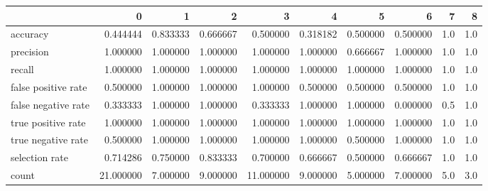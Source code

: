 \begin{tabular}{lrrrrrrrrr}
\toprule
{} &          0 &         1 &         2 &          3 &         4 &         5 &         6 &    7 &    8 \\
\midrule
accuracy            &   0.444444 &  0.833333 &  0.666667 &   0.500000 &  0.318182 &  0.500000 &  0.500000 &  1.0 &  1.0 \\
precision           &   1.000000 &  1.000000 &  1.000000 &   1.000000 &  1.000000 &  0.666667 &  1.000000 &  1.0 &  1.0 \\
recall              &   1.000000 &  1.000000 &  1.000000 &   1.000000 &  1.000000 &  1.000000 &  1.000000 &  1.0 &  1.0 \\
false positive rate &   0.500000 &  1.000000 &  1.000000 &   1.000000 &  0.500000 &  0.500000 &  0.500000 &  1.0 &  1.0 \\
false negative rate &   0.333333 &  1.000000 &  1.000000 &   0.333333 &  1.000000 &  1.000000 &  0.000000 &  0.5 &  1.0 \\
true positive rate  &   1.000000 &  1.000000 &  1.000000 &   1.000000 &  1.000000 &  1.000000 &  1.000000 &  1.0 &  1.0 \\
true negative rate  &   0.500000 &  1.000000 &  1.000000 &   1.000000 &  1.000000 &  0.500000 &  1.000000 &  1.0 &  1.0 \\
selection rate      &   0.714286 &  0.750000 &  0.833333 &   0.700000 &  0.666667 &  0.500000 &  0.666667 &  1.0 &  1.0 \\
count               &  21.000000 &  7.000000 &  9.000000 &  11.000000 &  9.000000 &  5.000000 &  7.000000 &  5.0 &  3.0 \\
\bottomrule
\end{tabular}
